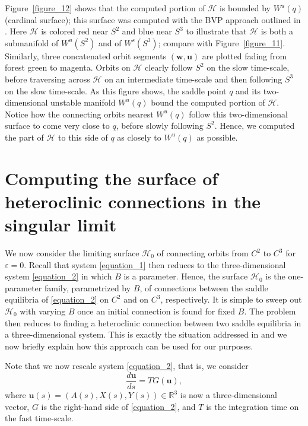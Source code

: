 \documentclass{ws-ijbc}
\begin{document}
Figure~\ref{figure_12} shows that the computed portion of $\mathscr{H}$ is bounded by $W^u(q)$ (cardinal surface); this surface was computed with the BVP approach outlined in \cite{Red_book}.  Here $\mathscr{H}$ is colored red near $S^2$ and blue near $S^3$ to illustrate that $\mathscr{H}$ is both a submanifold of $W^u(S^2)$ and of $W^s(S^3)$; compare with Figure~\ref{figure_11}.  Similarly, three concatenated orbit segments $(\mathbf{w},\mathbf{u})$ are plotted fading from forest green to magenta.  Orbits on $\mathscr{H}$ clearly follow $S^2$ on the slow time-scale, before traversing across $\mathscr{H}$ on an intermediate time-scale and then following $S^3$ on the slow time-scale.  As this figure shows, the saddle point $q$ and its two-dimensional unstable manifold $W^u(q)$ bound the computed portion of $\mathscr{H}$.  Notice how the connecting orbits nearest $W^u(q)$ follow this two-dimensional surface to come very close to $q$, before slowly following $S^2$. Hence, we computed the part of $\mathscr{H}$ to this side of $q$ as closely to $W^u(q)$ as possible.


\section{Computing the surface of heteroclinic connections in the singular limit}
\label{sec:hetconn0}

We now consider the limiting surface $\mathscr{H}_0$ of connecting orbits from $C^2$ to $C^3$ for $\varepsilon = 0$.  Recall that system \eqref{equation_1} then reduces to the three-dimensional system \eqref{equation_2} in which $B$ is a parameter.  Hence, the surface $\mathscr{H}_0$ is the one-parameter family, parametrized by $B$, of connections between the saddle equilibria of \eqref{equation_2} on $C^2$ and on $C^3$, respectively.  It is simple to sweep out $\mathscr{H}_0$ with varying $B$ once an initial connection is found for fixed $B$.  The problem then reduces to finding a heteroclinic connection between two saddle equilibria in a three-dimensional system.  This is exactly the situation addressed in \cite{Lin_POs, Red_book} and we now briefly explain how this approach can be used for our purposes.

Note that we now rescale system \eqref{equation_2}, that is, we consider
%
\begin{equation}
\frac{d\mathbf{u}}{ds} = TG(\mathbf{u}),
\label{fast_rescale}
\end{equation}
%
where $\mathbf{u}(s) = (A(s), X(s), Y(s)) \in \mathbb{R}^3$ is now a three-dimensional vector, $G$ is the right-hand side of \eqref{equation_2}, and $T$ is the integration time on the fast time-scale.
\end{document}
